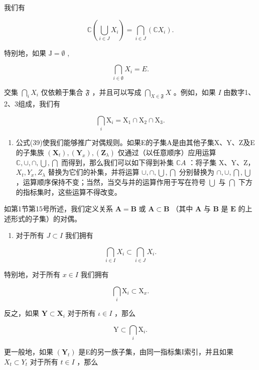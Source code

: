 我们有

\[
\mathbb {C} \left(\bigcup_ {i \in J} X _ {i}\right) = \bigcap_ {i \in J} \left(\mathbb {C} X _ {i}\right).\tag{39}
\]

特别地，如果 \(\mathrm{J} = \emptyset\) ,

\[
\bigcap_ {i \in \emptyset} X _ {i} = E.\tag{40}
\]

交集 \(\bigcap_{i} X_i\) 仅依赖于集合 \(\mathfrak{F}\) ，并且可以写成 \(\bigcap_{X \in \mathfrak{F}} X\) 。例如，如果 \(I\) 由数字1、2、3组成，我们有

\[
\bigcap_ {i} \mathrm{X} _ {i} = \mathrm{X} _ {1} \cap \mathrm{X} _ {2} \cap \mathrm{X} _ {3}.
\]

\begin{enumerate}
\def\labelenumi{\arabic{enumi}.}
\setcounter{enumi}{6}
\tightlist
\item
  公式(39)使我们能够推广对偶规则。如果E的子集A是由其他子集X、Y、Z及E的子集族 \((\mathbf{X}_{t}), (\mathbf{Y}_{x}), (\mathbf{Z}_{\lambda})\) 仅通过（以任意顺序）应用运算 \(\mathbb C, \cup, \cap, \bigcup, \bigcap\) 而得到，那么我们可以如下得到补集 \(\mathbb C A\) ：将子集 X、Y、Z， \(X_{t}, Y_{x}, Z_{\lambda}\) 替换为它们的补集，并将运算 \(\cup, \cap, \bigcup, \bigcap\) 分别替换为 \(\cap, \cup, \bigcap, \bigcup\) ，运算顺序保持不变；当然，当交与并的运算作用于写在符号 \(\bigcup\) 与 \(\bigcap\) 下方的指标集时，这些运算不得改变。
\end{enumerate}

如第1节第15号所述，我们定义关系 \(\mathbf{A} = \mathbf{B}\) 或 \(\mathbf{A} \subset \mathbf{B}\) （其中 \(\mathbf{A}\) 与 \(\mathbf{B}\) 是 \(\mathbf{E}\) 的上述形式的子集）的对偶。

\begin{enumerate}
\def\labelenumi{\arabic{enumi}.}
\setcounter{enumi}{7}
\tightlist
\item
  对于所有 \(J \subset I\) 我们拥有
\end{enumerate}

\[
\bigcap_ {i \in I} X _ {i} \subset \bigcap_ {i \in J} X _ {i}.
\]

特别地，对于所有 \(x \in I\) 我们拥有

\[
\bigcap_ {i} \mathrm{X} _ {i} \subset \mathrm{X} _ {x}.
\]

反之，如果 \(\mathbf{Y} \subset \mathbf{X}_i\) 对于所有 \(\iota \in I\) ，那么

\[
\mathrm{Y} \subset \bigcap_ {i} \mathrm{X} _ {i}.
\]

更一般地，如果 \((\mathbf{Y}_{t})\) 是E的另一族子集，由同一指标集I索引，并且如果 \(X_{t} \subset Y_{t}\) 对于所有 \(t \in I\) ，那么

